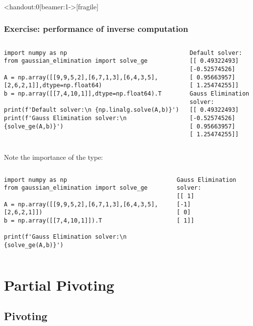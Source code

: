 \begin{frame}<handout:0|beamer:1->[fragile]
  \frametitle{Exercise: performance of inverse computation}
  \begin{columns}
    \begin{lstlisting}
import numpy as np
from gaussian_elimination import solve_ge

A = np.array([[9,9,5,2],[6,7,1,3],[6,4,3,5],[2,6,2,1]],dtype=np.float64)
b = np.array([[7,4,10,1]],dtype=np.float64).T

print(f'Default solver:\n {np.linalg.solve(A,b)}')
print(f'Gauss Elimination solver:\n {solve_ge(A,b)}')
  \end{lstlisting}
      
      \begin{lstlisting}[style=output]
Default solver:
[[ 0.49322493]
[-0.52574526]
[ 0.95663957]
[ 1.25474255]]
Gauss Elimination solver:
[[ 0.49322493]
[-0.52574526]
[ 0.95663957]
[ 1.25474255]]
      \end{lstlisting}
  \end{columns}
  \pause
  Note the importance of the type:
  \begin{columns}
    \begin{lstlisting}
import numpy as np
from gaussian_elimination import solve_ge

A = np.array([[9,9,5,2],[6,7,1,3],[6,4,3,5],[2,6,2,1]])
b = np.array([[7,4,10,1]]).T

print(f'Gauss Elimination solver:\n {solve_ge(A,b)}')
      \end{lstlisting}
      
      \begin{lstlisting}[style=output]
Gauss Elimination solver:
[[ 1]
[-1]
[ 0]
[ 1]]
      \end{lstlisting}
  \end{columns}
  
\end{frame}

\section{Partial Pivoting}
\subsection*{Pivoting}

